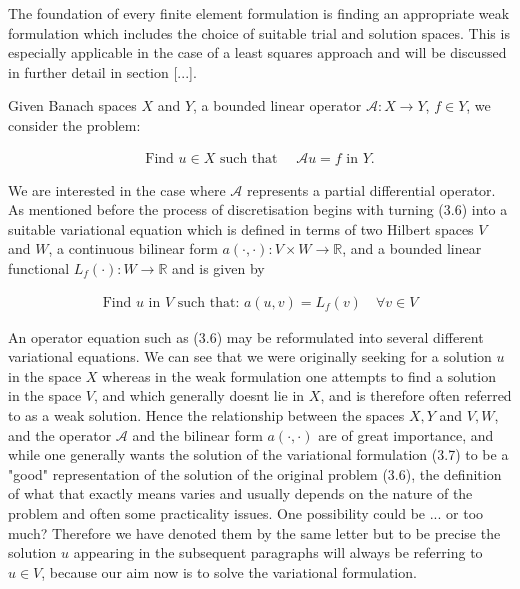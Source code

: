 \documentclass[../draft_1.tex]{subfiles}
\begin{document}
The foundation of every finite element formulation is finding an appropriate weak formulation which includes the choice of suitable trial and solution spaces. This is especially applicable in the case of a least squares approach and will be discussed in further detail in section [...]. 

Given Banach spaces $X$ and $Y$, a bounded linear operator $\mathcal{A} : X \rightarrow Y$, $f \in Y$, we consider the problem:
\begin{ceqn}
\begin{align}
\text{Find } u \in X \text{ such that } \quad \mathcal{A} u = f \text{ in } Y.
\end{align}
\end{ceqn}

We are interested in the case where $\mathcal{A}$ represents a partial differential operator. As mentioned before the process of discretisation begins with turning (3.6) into a suitable variational equation which is defined in terms of two Hilbert spaces $V$ and $W$, a continuous bilinear form $a(\cdot, \cdot): V \times W \rightarrow \mathbb{R}$, and a bounded linear functional $L_f(\cdot): W \rightarrow \mathbb{R}$ and is given by
\begin{ceqn}
\begin{equation}
\begin{aligned}
\text{Find } u \text{ in } V \text{ such that:  } a(u, v) = L_f(v) \quad \forall v \in V
\end{aligned}
\end{equation}
\end{ceqn}
An operator equation such as (3.6) may be reformulated into several different variational equations. We can see that we were originally seeking for a solution $u$ in the space $X$ whereas in the weak formulation one attempts to find a solution in the space $V$, and which generally doesnt lie in $X$, and is therefore often referred to as a weak solution. Hence the relationship between the spaces $X, Y$ and $V, W$, and the operator $\mathcal{A}$ and the bilinear form $a(\cdot, \cdot)$ are of great importance, and while one generally wants the solution of the variational formulation (3.7) to be a "good" representation of the solution of the original problem (3.6), the definition of what that exactly means varies and usually depends on the nature of the problem and often some practicality issues. One possibility could be ... or too much? Therefore we have denoted them by the same letter but to be precise the solution $u$ appearing in the subsequent paragraphs will always be referring to $u \in V$, because our aim now is to solve the variational formulation.
\end{document}
